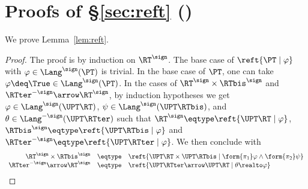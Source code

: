



\section{Proofs of \S\ref{sec:reft} ()}
\label{sec:proof:reft}

We prove Lemma~\ref{lem:reft}.

\LemReft*

\begin{proof}
The proof is by induction on $\RT^\sign$.
The base case of $\reft{\PT \mid \varphi}$
with $\varphi \in \Lang^\sign(\PT)$ is trivial.
In the base case of $\PT$, one can take $\varphi \deq \True \in \Lang^\sign(\PT)$.
In the cases of $\RT^\sign \times \RTbis^\sign$
and $\RTter^{-\sign} \arrow \RT^\sign$,
by induction hypotheses we get
$\varphi \in \Lang^\sign(\UPT\RT)$,
$\psi \in \Lang^\sign(\UPT\RTbis)$,
and $\theta \in \Lang^{-\sign}(\UPT\RTter)$
such that
$\RT^\sign \eqtype \reft{\UPT\RT \mid \varphi}$,
$\RTbis^\sign \eqtype \reft{\UPT\RTbis \mid \varphi}$
and
$\RTter^{-\sign} \eqtype \reft{\UPT\RTter \mid \varphi}$.
We then conclude with
\[
\begin{array}{r c l}
  \RT^\sign \times \RTbis^\sign
& \eqtype
& \reft{\UPT\RT \times \UPT\RTbis \mid \form{\pi_1}\varphi \land \form{\pi_2}\psi}
\\
%
  \RTter^{-\sign} \arrow \RT^\sign
& \eqtype
& \reft{\UPT\RTter \arrow \UPT\RT \mid \theta \realto \varphi}
\end{array}
\]
\end{proof}





